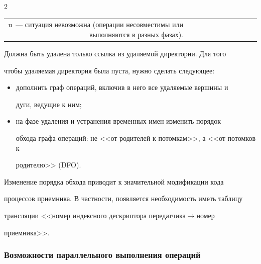 \begin{multicols}{2}
\begin{table}
\begin{center}
\begin{tabular}{|rl|c|c|c|c|c|c|c|c|c|}
{{u~--- ситуация невозможна (операции несовместимы или выполняются в разных фазах).}}


\end{tabular}


\end{center}


\vspace*{-6pt}


\end{table} 





      Должна быть удалена только ссылка из удаля\-емой директории. Для того 


чтобы удаляемая директория была пуста, нужно сделать следующее:


      \begin{itemize}


\item дополнить граф операций, включив в него все удаляемые вершины и 


дуги, ведущие к ним;


\item на фазе удаления и устранения временных имен изменить порядок 


обхода графа операций: не <<от родителей к потомкам>>, а <<от потомков к 


родителю>> (DFO). 


\end{itemize}





      Изменение порядка обхода приводит к значительной модификации кода 


процессов приемника. В частности, появляется необходимость иметь таб\-ли\-цу 


трансляции <<номер индексного дескриптора передатчика\;$\rightarrow$\;номер 


приемника>>.





\vspace*{-6pt}





\subsubsection{Возможности параллельного выполнения операций} %






\end{multicols}
